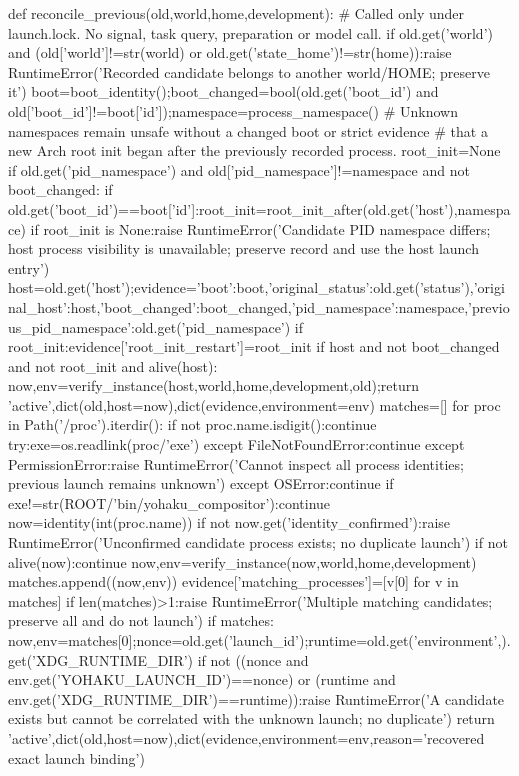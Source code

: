 def reconcile_previous(old,world,home,development):
 # Called only under launch.lock. No signal, task query, preparation or model call.
 if old.get('world') and (old['world']!=str(world) or old.get('state_home')!=str(home)):raise RuntimeError('Recorded candidate belongs to another world/HOME; preserve it')
 boot=boot_identity();boot_changed=bool(old.get('boot_id') and old['boot_id']!=boot['id']);namespace=process_namespace()
 # Unknown namespaces remain unsafe without a changed boot or strict evidence
 # that a new Arch root init began after the previously recorded process.
 root_init=None
 if old.get('pid_namespace') and old['pid_namespace']!=namespace and not boot_changed:
  if old.get('boot_id')==boot['id']:root_init=root_init_after(old.get('host'),namespace)
  if root_init is None:raise RuntimeError('Candidate PID namespace differs; host process visibility is unavailable; preserve record and use the host launch entry')
 host=old.get('host');evidence={'boot':boot,'original_status':old.get('status'),'original_host':host,'boot_changed':boot_changed,'pid_namespace':namespace,'previous_pid_namespace':old.get('pid_namespace')}
 if root_init:evidence['root_init_restart']=root_init
 if host and not boot_changed and not root_init and alive(host):
  now,env=verify_instance(host,world,home,development,old);return 'active',dict(old,host=now),dict(evidence,environment=env)
 matches=[]
 for proc in Path('/proc').iterdir():
  if not proc.name.isdigit():continue
  try:exe=os.readlink(proc/'exe')
  except FileNotFoundError:continue
  except PermissionError:raise RuntimeError('Cannot inspect all process identities; previous launch remains unknown')
  except OSError:continue
  if exe!=str(ROOT/'bin/yohaku_compositor'):continue
  now=identity(int(proc.name))
  if not now.get('identity_confirmed'):raise RuntimeError('Unconfirmed candidate process exists; no duplicate launch')
  if not alive(now):continue
  now,env=verify_instance(now,world,home,development)
  matches.append((now,env))
 evidence['matching_processes']=[v[0] for v in matches]
 if len(matches)>1:raise RuntimeError('Multiple matching candidates; preserve all and do not launch')
 if matches:
  now,env=matches[0];nonce=old.get('launch_id');runtime=old.get('environment',{}).get('XDG_RUNTIME_DIR')
  if not ((nonce and env.get('YOHAKU_LAUNCH_ID')==nonce) or (runtime and env.get('XDG_RUNTIME_DIR')==runtime)):raise RuntimeError('A candidate exists but cannot be correlated with the unknown launch; no duplicate')
  return 'active',dict(old,host=now),dict(evidence,environment=env,reason='recovered exact launch binding')
